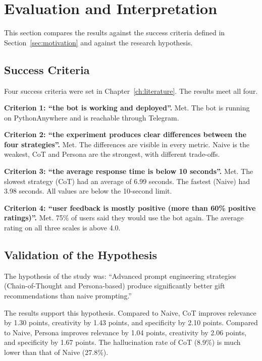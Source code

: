 \section{Evaluation and Interpretation}
\label{sec:evaluation}

This section compares the results against the success criteria defined in Section~\ref{sec:motivation} and against the research hypothesis.

\subsection{Success Criteria}

Four success criteria were set in Chapter~\ref{ch:literature}. The results meet all four.

\textbf{Criterion 1: ``the bot is working and deployed''.} Met. The bot is running on PythonAnywhere and is reachable through Telegram.

\textbf{Criterion 2: ``the experiment produces clear differences between the four strategies''.} Met. The differences are visible in every metric. Naive is the weakest, CoT and Persona are the strongest, with different trade-offs.

\textbf{Criterion 3: ``the average response time is below 10 seconds''.} Met. The slowest strategy (CoT) had an average of 6.99 seconds. The fastest (Naive) had 3.98 seconds. All values are below the 10-second limit.

\textbf{Criterion 4: ``user feedback is mostly positive (more than 60\% positive ratings)''.} Met. 75\% of users said they would use the bot again. The average rating on all three scales is above 4.0.

\subsection{Validation of the Hypothesis}

The hypothesis of the study was: ``Advanced prompt engineering strategies (Chain-of-Thought and Persona-based) produce significantly better gift recommendations than naive prompting.''

The results support this hypothesis. Compared to Naive, CoT improves relevance by 1.30 points, creativity by 1.43 points, and specificity by 2.10 points. Compared to Naive, Persona improves relevance by 1.04 points, creativity by 2.06 points, and specificity by 1.67 points. The hallucination rate of CoT (8.9\%) is much lower than that of Naive (27.8\%).

